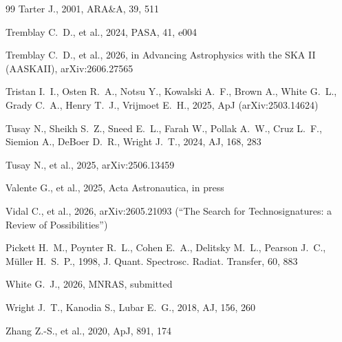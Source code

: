 \documentclass{openjournal}
\begin{document}
\begin{thebibliography}{99}
 Tarter J., 2001, ARA\&A, 39, 511

 Tremblay C.~D., et al., 2024, PASA, 41, e004

 Tremblay C.~D., et al., 2026, in Advancing Astrophysics with the SKA II (AASKAII), arXiv:2606.27565

 Tristan I.~I., Osten R.~A., Notsu Y., Kowalski A.~F., Brown A., White G.~L., Grady C.~A., Henry T.~J., Vrijmoet E.~H., 2025, ApJ (arXiv:2503.14624)

 Tusay N., Sheikh S.~Z., Sneed E.~L., Farah W., Pollak A.~W., Cruz L.~F., Siemion A., DeBoer D.~R., Wright J.~T., 2024, AJ, 168, 283

 Tusay N., et al., 2025, arXiv:2506.13459

 Valente G., et al., 2025, Acta Astronautica, in press

 Vidal C., et al., 2026, arXiv:2605.21093 (``The Search for Technosignatures: a Review of Possibilities'')


 Pickett H.~M., Poynter R.~L., Cohen E.~A., Delitsky M.~L., Pearson J.~C., M\"uller H.~S.~P., 1998, J. Quant. Spectrosc. Radiat. Transfer, 60, 883

 White G.~J., 2026, MNRAS, submitted

 Wright J.~T., Kanodia S., Lubar E.~G., 2018, AJ, 156, 260

 Zhang Z.-S., et al., 2020, ApJ, 891, 174

\end{thebibliography}
\end{document}
